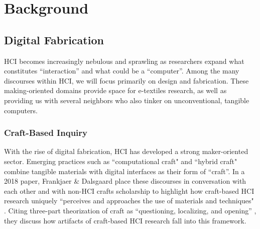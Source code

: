 \chapter{Background}


\section{Digital Fabrication}

HCI becomes increasingly nebulous and sprawling as researchers expand what constitutes ``interaction'' and what could be a ``computer''. Among the many discourses within HCI, we will focus primarily on design and fabrication. These making-oriented domains provide space for e-textiles research, as well as providing us with several neighbors who also tinker on unconventional, tangible computers.

\subsection{}

\subsection{Craft-Based Inquiry}

With the rise of digital fabrication, HCI has developed a strong maker-oriented sector. Emerging practices such as ``computational craft" and ``hybrid craft" combine tangible materials with digital interfaces as their form of ``craft''. In a 2018 paper,
Frankjaer \& Dalsgaard place these discourses in conversation with each other and with non-HCI crafts scholarship to highlight how craft-based HCI research uniquely ``perceives and approaches the use of materials and techniques" \cite{frankjaer_understanding_2018}. Citing  three-part theorization of craft as ``questioning, localizing, and opening'' , they discuss how artifacts of craft-based HCI research fall into this framework.

